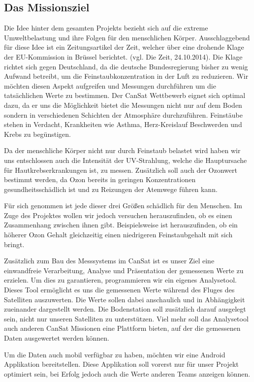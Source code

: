 \subsection{Das Missionsziel}
Die Idee hinter dem gesamten Projekts bezieht sich auf die extreme Umweltbelastung und ihre Folgen für den menschlichen Körper. Ausschlaggebend für diese Idee ist ein Zeitungsartikel der Zeit, welcher über eine drohende Klage der EU-Kommission in Brüssel berichtet. (vgl. Die Zeit, 24.10.2014). Die Klage richtet sich gegen Deutschland, da die deutsche Bundesregierung bisher zu wenig Aufwand betreibt, um die Feinstaubkonzentration in der Luft zu reduzieren. Wir möchten diesen Aspekt aufgreifen und Messungen durchführen um die tatsächlichen Werte zu bestimmen. Der CanSat Wettbewerb eignet sich optimal dazu, da er uns die Möglichkeit bietet die Messungen nicht nur auf dem Boden sondern in verschiedenen Schichten der Atmosphäre durchzuführen. Feinstäube stehen in Verdacht, Krankheiten wie Asthma, Herz-Kreislauf Beschwerden und Krebs zu begünstigen.

Da der menschliche Körper nicht nur durch Feinstaub belastet wird haben wir uns entschlossen auch die Intensität der UV-Strahlung, welche die Hauptursache für Hautkrebserkrankungen ist, zu messen. Zusätzlich soll auch der Ozonwert bestimmt werden, da Ozon bereits in geringen Konzentrationen gesundheitsschädlich ist und zu Reizungen der Atemwege führen kann.

Für sich genommen ist jede dieser drei Größen schädlich für den Menschen. Im Zuge des Projektes wollen wir jedoch versuchen herauszufinden, ob es einen Zusammenhang zwischen ihnen gibt. Beispielsweise ist herauszufinden, ob ein höherer Ozon Gehalt gleichzeitig einen niedrigeren Feinstaubgehalt mit sich bringt.

Zusätzlich zum Bau des Messsystems im CanSat ist es unser Ziel eine einwandfreie Verarbeitung, Analyse und Präsentation der gemessenen Werte zu erzielen. Um dies zu garantieren,  programmieren wir ein eigenes Analysetool. Dieses Tool ermöglicht es uns die gemessenen Werte während des Fluges des Satelliten auszuwerten. Die Werte sollen dabei anschaulich und in Abhängigkeit zueinander dargestellt werden. Die Bodenstation soll zusätzlich darauf ausgelegt sein, nicht nur unseren Satelliten zu unterstützen. Viel mehr soll das Analysetool auch anderen CanSat Missionen eine Plattform bieten, auf der die gemessenen Daten ausgewertet werden können.

Um die Daten auch mobil verfügbar zu haben, möchten wir eine Android Applikation bereitstellen. Diese Applikation soll vorerst nur für unser Projekt optimiert sein, bei Erfolg jedoch auch die Werte anderen Teams anzeigen können.

